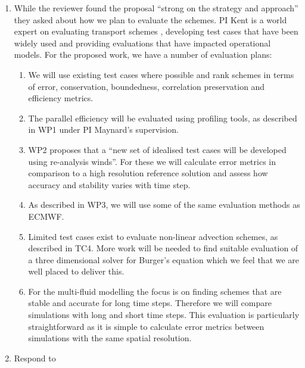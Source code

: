 \begin{itemize}
\begin{enumerate}
\item While the reviewer found the proposal ``strong on the strategy and approach'' they asked about how we plan to evaluate the schemes. PI Kent is a world expert on evaluating transport schemes \cite[]{KENT2014b,KENT2014c,KENT2012a,KENTHOLDAWAY,KENT2014a,DCMIP2016}, developing test cases that have been widely used and providing evaluations that have impacted operational models. For the proposed work, we have a number of evaluation plans:
    \begin{enumerate}
    \item We will use existing test cases where possible and rank schemes in terms of error, conservation, boundedness, correlation preservation and efficiency metrics. 
    \item The parallel efficiency will be evaluated using profiling tools, as described in WP1 under PI Maynard's supervision.
    \item WP2 proposes that a ``new set of idealised test cases will be developed using re-analysis winds''. For these we will calculate error metrics in comparison to a high resolution reference solution and assess how accuracy and stability varies with time step.
    \item As described in WP3, we will use some of the same evaluation methods as ECMWF.
    \item Limited test cases exist to evaluate non-linear advection schemes, as described in TC4. More work will be needed to find suitable evaluation of a three dimensional solver for Burger's equation which we feel that we are well placed to deliver this.
    \item For the multi-fluid modelling the focus is on finding schemes that are stable and accurate for long time steps. Therefore we will compare simulations with long and short time steps. This evaluation is particularly straightforward as it is simple to calculate error metrics between simulations with the same spatial resolution. 
    \end{enumerate}

\item Respond to 


\end{enumerate}
\end{itemize}
